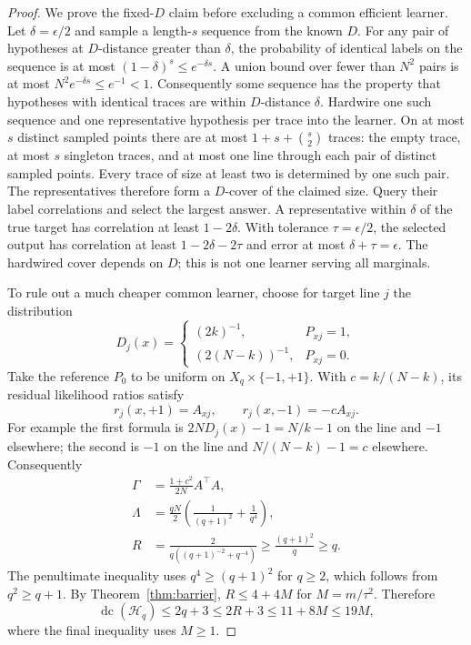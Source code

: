 \documentclass[11pt]{article}
\DeclareMathOperator{\dc}{dc}
\newcommand{\1}{\mathbf 1}
\newcommand{\cH}{\mathcal H}
\begin{document}
\begin{proof}
We prove the fixed-$D$ claim before excluding a common efficient learner. Let $\delta=\epsilon/2$ and sample a length-$s$ sequence from the known $D$. For any pair of hypotheses at $D$-distance greater than $\delta$, the probability of identical labels on the sequence is at most $(1-\delta)^s\leq e^{-\delta s}$. A union bound over fewer than $N^2$ pairs is at most $N^2e^{-\delta s}\leq e^{-1}<1$. Consequently some sequence has the property that hypotheses with identical traces are within $D$-distance $\delta$. Hardwire one such sequence and one representative hypothesis per trace into the learner. On at most $s$ distinct sampled points there are at most $1+s+\binom{s}{2}$ traces: the empty trace, at most $s$ singleton traces, and at most one line through each pair of distinct sampled points. Every trace of size at least two is determined by one such pair. The representatives therefore form a $D$-cover of the claimed size. Query their label correlations and select the largest answer. A representative within $\delta$ of the true target has correlation at least $1-2\delta$. With tolerance $\tau=\epsilon/2$, the selected output has correlation at least $1-2\delta-2\tau$ and error at most $\delta+\tau=\epsilon$. The hardwired cover depends on $D$; this is not one learner serving all marginals.

To rule out a much cheaper common learner, choose for target line $j$ the distribution
\[
 D_j(x)=\begin{cases}(2k)^{-1},&P_{xj}=1,\\[1mm]
 (2(N-k))^{-1},&P_{xj}=0.
 \end{cases}
\]
Take the reference $P_0$ to be uniform on $X_q\times\{-1,+1\}$. With $c=k/(N-k)$, its residual likelihood ratios satisfy
\[
 r_j(x,+1)=A_{xj},\qquad r_j(x,-1)=-cA_{xj}.
\]
For example the first formula is $2N D_j(x)-1=N/k-1$ on the line and $-1$ elsewhere; the second is $-1$ on the line and $N/(N-k)-1=c$ elsewhere. Consequently
\begin{align*}
 \Gamma&=\frac{1+c^2}{2N}A^\top A,\\
 \Lambda&=\frac{qN}{2}\left(\frac1{(q+1)^2}+\frac1{q^4}\right),\\
 R&=\frac{2}{q((q+1)^{-2}+q^{-4})}\geq\frac{(q+1)^2}{q}\geq q.
\end{align*}
The penultimate inequality uses $q^4\geq(q+1)^2$ for $q\geq2$, which follows from $q^2\geq q+1$. By Theorem~\ref{thm:barrier}, $R\leq4+4M$ for $M=m/\tau^2$. Therefore
\[
 \dc(\cH_q)\leq2q+3\leq2R+3\leq11+8M\leq19M,
\]
where the final inequality uses $M\geq1$.
\end{proof}
\end{document}

